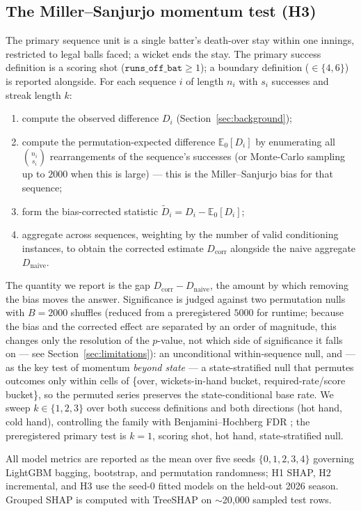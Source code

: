 \subsection{The Miller--Sanjurjo momentum test (H3)}
\label{sec:h3method}
The primary sequence unit is a single batter's death-over stay within one
innings, restricted to legal balls faced; a wicket ends the stay. The primary
success definition is a scoring shot ($\texttt{runs\_off\_bat} \ge 1$); a
boundary definition ($\in \{4,6\}$) is reported alongside. For each sequence $i$
of length $n_i$ with $s_i$ successes and streak length $k$:
\begin{enumerate}
  \item compute the observed difference $D_i$ (Section~\ref{sec:background});
  \item compute the permutation-expected difference $\mathbb{E}_0[D_i]$ by
        enumerating all $\binom{n_i}{s_i}$ rearrangements of the sequence's
        successes (or Monte-Carlo sampling up to $2000$ when this is large) ---
        this is the Miller--Sanjurjo bias for that sequence;
  \item form the bias-corrected statistic $\tilde{D}_i = D_i - \mathbb{E}_0[D_i]$;
  \item aggregate across sequences, weighting by the number of valid conditioning
        instances, to obtain the corrected estimate $D_{\text{corr}}$ alongside
        the naive aggregate $D_{\text{naive}}$.
\end{enumerate}
The quantity we report is the gap $D_{\text{corr}} - D_{\text{naive}}$, the amount
by which removing the bias moves the answer. Significance is judged against two
permutation nulls with $B = 2000$ shuffles (reduced from a preregistered $5000$ for
runtime; because the bias and the corrected effect are separated by an order of
magnitude, this changes only the resolution of the $p$-value, not which side of
significance it falls on --- see Section~\ref{sec:limitations}): an unconditional
within-sequence null,
and --- as the key test of momentum \emph{beyond state} --- a state-stratified
null that permutes outcomes only within cells of \{over, wickets-in-hand bucket,
required-rate/score bucket\}, so the permuted series preserves the
state-conditional base rate. We sweep $k \in \{1,2,3\}$ over both success
definitions and both directions (hot hand, cold hand), controlling the family
with Benjamini--Hochberg FDR \citep{benjamini1995controlling}; the preregistered
primary test is $k=1$, scoring shot, hot hand, state-stratified null.

All model metrics are reported as the mean over five seeds $\{0,1,2,3,4\}$
governing LightGBM bagging, bootstrap, and permutation randomness; H1 SHAP, H2
incremental, and H3 use the seed-0 fitted models on the held-out 2026 season.
Grouped SHAP \citep{lundberg2017shap} is computed with TreeSHAP on
$\sim$20{,}000 sampled test rows.
